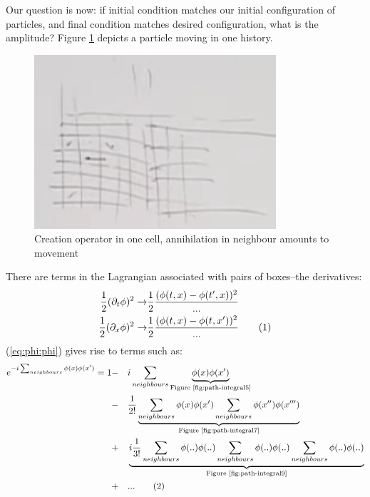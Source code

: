 \documentclass[]{article}
\newcommand\numberthis{\addtocounter{equation}{1}\tag{\theequation}}
\begin{document}
Our question is now: if initial condition matches our initial configuration of particles, and final condition matches desired configuration, what is the amplitude? Figure \ref{fig:path-integral3} depicts a particle moving in one history.

\begin{figure}[H]
	\caption[Particle moving]{Creation operator in one cell, annihilation in neighbour amounts to movement}\label{fig:path-integral3}
	\includegraphics[width=0.8\textwidth]{path-integral3}
\end{figure}

There are terms in the Lagrangian associated with pairs of boxes--the derivatives:
\begin{align*}
	\frac{1}{2}(\partial_t \phi)^2 \rightarrow& \frac{1}{2}\frac{(\phi(t,x)-\phi(t^\prime,x))^2}{...}\\
	\frac{1}{2}(\partial_x \phi)^2 \rightarrow& \frac{1}{2}\frac{(\phi(t,x)-\phi(t,x^\prime))^2}{...} \numberthis \label{eq:phi:phi}
\end{align*}
(\ref{eq:phi:phi}) gives rise to terms such as:
\begin{alignat*}{2}
	e^{- i \sum_{neighbours} \phi(x) \phi(x^\prime)}=1& -&& i \sum_{neighbours} \underbrace{\phi(x) \phi(x^\prime)}_\text{Figure \ref{fig:path-integral5}}\\
	&-&& \frac{1}{2!}\underbrace{\sum_{neighbours} \phi(x) \phi(x^\prime)\sum_{neighbours} \phi(x^{\prime\prime}) \phi(x^{\prime\prime\prime})}_\text{Figure \ref{fig:path-integral7}}\\
	&+&&\underbrace{i\frac{1}{3!}\sum_{neighbours}\phi(..)\phi(..)\sum_{neighbours}\phi(..)\phi(..)\sum_{neighbours}\phi(..)\phi(..)}_\text{Figure \ref{fig:path-integral9}}\\
	&+&& ... \numberthis \label{eq:path:integral:expanded}
\end{alignat*}
\end{document}
